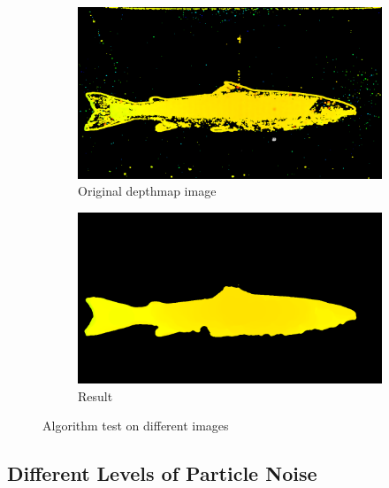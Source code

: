 \begin{figure}[H]
    \medskip
    \begin{subfigure}{0.48\textwidth}
        \includegraphics[width=\linewidth]{images/implementation/algorithm_test/original_87}
        \caption{Original depthmap image} 
        \label{fig:original_depthmap_87}
    \end{subfigure}\hspace*{\fill}
    \begin{subfigure}{0.48\textwidth}
        \includegraphics[width=\linewidth]{images/implementation/algorithm_test/median_filter_87}
        \caption{Result} 
        \label{fig:result_87}
    \end{subfigure}
    
    \caption{Algorithm test on different images} 
    \label{fig:algorithm_test}
\end{figure}

\newpage




\subsection{Different Levels of Particle Noise} \label{section:noise}


